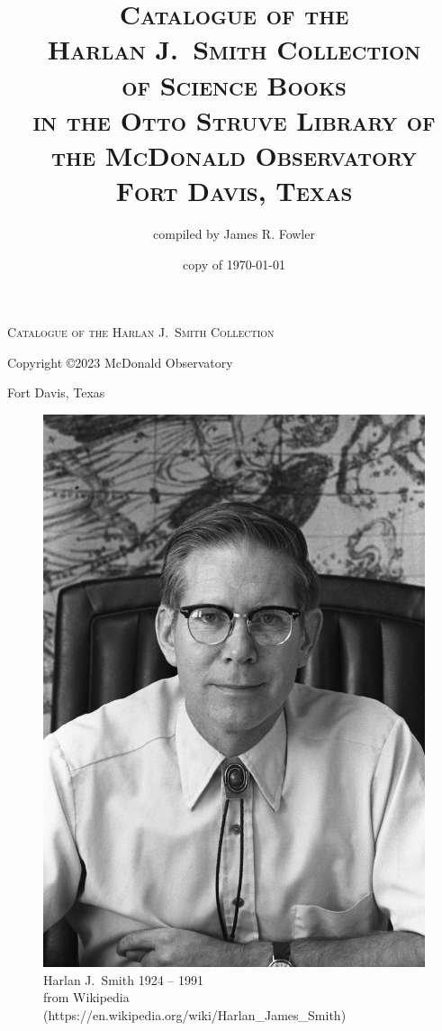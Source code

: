 \documentclass[letterpaper]{book}
\begin{document}
\frontmatter
\thispagestyle{empty}
\vspace*{1 in}
\begin{centering}
  \textsc{\Large Catalogue of the Harlan J.~Smith Collection}
\end{centering}
\newpage

\thispagestyle{empty}
\title{\textsc{Catalogue of the \\
    Harlan J.\ Smith Collection \\
    of Science Books \\
    in the Otto Struve Library of \\
    the McDonald Observatory \\
    Fort Davis, Texas}}
\author{compiled by James R. Fowler}
\date{copy of \today}
\maketitle
\newpage
\thispagestyle{empty}
\vspace*{5 in}
\centerline{Copyright \copyright 2023 McDonald Observatory}
\centerline{Fort Davis, Texas}
\newpage

\thispagestyle{empty}
\begin{figure}[t]
  \centering
  \includegraphics{hjs_photo.jpg}
  Harlan J.~Smith 1924 -- 1991 \\
  {\scriptsize from Wikipedia
  (https://en.wikipedia.org/wiki/Harlan\_James\_Smith)}
  \label{fig:hjs}
\end{figure}
\clearpage
\mbox{}
\thispagestyle{empty}
\newpage
\end{document}
